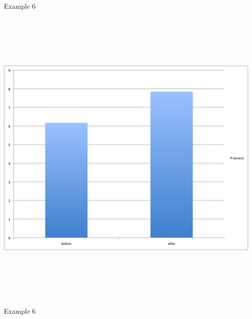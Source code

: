 \documentclass[12pt]{article}
\newcommand{\headsize}{\fontsize{35}{35} \selectfont}
\begin{document}
\newpage


\headsize \color{myyellow}
\hfill \begin{minipage}{5.75in}
\centering
Example 6
\end{minipage}

\vspace{30mm}

\centerline{\includegraphics[height=6in]{Figs/fig6r_g.png}}


\newpage


\headsize \color{myyellow}
\hfill \begin{minipage}{5.75in}
\centering
Example 6
\end{minipage}

\vspace{30mm}
\end{document}
